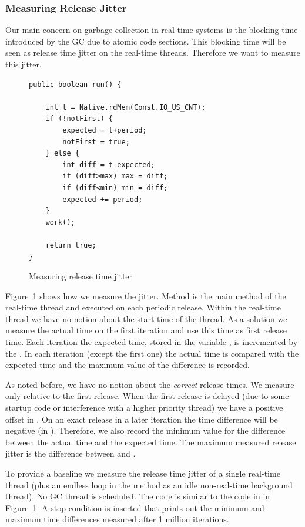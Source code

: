 \subsubsection{Measuring Release Jitter}

Our main concern on garbage collection in real-time systems is the
blocking time introduced  by the GC due to atomic code sections.
This blocking time will be seen as release time jitter on the
real-time threads. Therefore we want to measure this jitter.

\begin{figure}
{\small
\begin{verbatim}
public boolean run() {

    int t = Native.rdMem(Const.IO_US_CNT);
    if (!notFirst) {
        expected = t+period;
        notFirst = true;
    } else {
        int diff = t-expected;
        if (diff>max) max = diff;
        if (diff<min) min = diff;
        expected += period;
    }
    work();

    return true;
}
\end{verbatim} }
    \caption{Measuring release time jitter}
    \label{lst:measure}
\end{figure}

Figure~\ref{lst:measure} shows how we measure the jitter. Method
 is the main method of the real-time thread and executed
on each periodic release. Within the real-time thread we have no
notion about the start time of the thread. As a solution we measure
the actual time on the first iteration and use this time as first
release time. Each iteration the expected time, stored in the
variable , is incremented by the . In
each iteration (except the first one) the actual time is compared
with the expected time and the maximum value of the difference is
recorded.

As noted before, we have no notion about the \emph{correct} release
times. We measure only relative to the first release. When the first
release is delayed (due to some startup code or interference with a
higher priority thread) we have a positive offset in
. On an exact release in a later iteration the time
difference will be negative (in ). Therefore, we also
record the minimum value for the difference between the actual time
and the expected time. The maximum measured release jitter is the
difference between  and .

To provide a baseline we measure the release time jitter of a single
real-time thread (plus an endless loop in the  method as
an idle non-real-time background thread). No GC thread is scheduled.
The code is similar to the code in in Figure~\ref{lst:measure}. A
stop condition is inserted that prints out the minimum and maximum
time differences measured after 1 million iterations.

